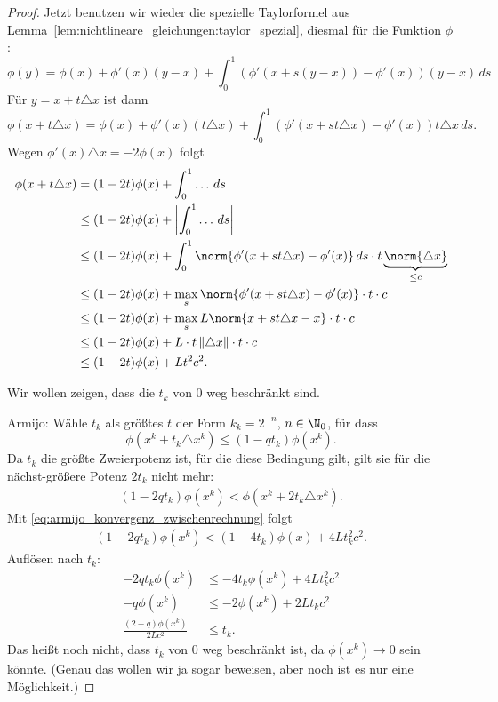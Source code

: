\begin{proof}
Jetzt benutzen wir wieder die spezielle Taylorformel aus Lemma~\ref{lem:nichtlineare_gleichungen:taylor_spezial},
diesmal für die Funktion $\phi$:
\begin{equation*}
 \phi(y)=\phi(x)+\phi'(x)(y-x)+\int_0^1 ( \phi'(x+s(y-x))-\phi'(x) )(y-x) \,ds
\end{equation*}
Für $y=x+t \triangle x$ ist dann
\begin{equation*}
 \phi(x+t \triangle x)
 =
 \phi(x)+\phi'(x)(t \triangle x)+\int_0^1 ( \phi'(x+st \triangle x)-\phi'(x) )t \triangle x \,ds.
\end{equation*}
Wegen $\phi'(x) \triangle x=-2 \phi(x)$ folgt
\begin{align}
\nonumber
 \phi (x+t \triangle x) & =(1-2t) \phi (x)+\int_0^1 \ldots \,ds \\
\nonumber
 & \leq (1-2t) \phi (x)+\left\vert \int_0^1 \ldots \,ds \right\vert \\
\nonumber
 & \leq (1-2t) \phi (x)+\int_0^1 \norm{ \phi'(x+st \triangle x)-\phi'(x) } \,ds \cdot t \underbrace{\norm{\triangle x}}_{\leq c} \\
\nonumber
 & \leq (1-2t) \phi (x)+\max_s \norm{ \phi'(x+st \triangle x)-\phi'(x) } \cdot t \cdot c \\
\nonumber
 & \leq (1-2t) \phi (x)+\max_s L \norm{ x+st \triangle x-x } \cdot t \cdot c \\
\nonumber
 & \leq (1-2t) \phi (x)+L \cdot t \left\Vert \triangle x \right\Vert \cdot t \cdot c \\
\label{eq:armijo_konvergenz_zwischenrechnung}
 & \leq (1-2t) \phi (x)+Lt^2c^2.
\end{align}

Wir wollen zeigen, dass die $t_k$ von $0$ weg beschränkt sind.

\medskip

Armijo: Wähle $t_k$ als größtes $t$ der Form $k_k = 2^{-n}$, $n \in \N_0$, für dass
\begin{equation*}
 \phi (x^k+t_k \triangle x^k ) \leq (1-qt_k ) \phi (x^k).
\end{equation*}
Da $t_k$ die größte Zweierpotenz ist, für die diese Bedingung gilt, gilt sie für die nächst-größere Potenz $2t_k$
nicht mehr:
\begin{align*}
 (1-2qt_k ) \phi (x^k) < \phi (x^k+2t_k \triangle x^k ).
\end{align*}
Mit \eqref{eq:armijo_konvergenz_zwischenrechnung} folgt
\begin{align*}
 (1-2qt_k ) \phi (x^k) < (1-4t_k) \phi(x) + 4Lt_k^2c^2.
\end{align*}
Auflösen nach $t_k$:
\begin{align*}
 -2qt_k \phi (x^k) & \le -4t_k \phi (x^k ) + 4Lt_k^2c^2 \\
 -q \phi (x^k) & \le -2 \phi (x^k ) + 2Lt_kc^2 \\
 \frac{(2-q) \phi (x^k )}{2Lc^2} & \le t_k.
\end{align*}
Das heißt noch nicht, dass $t_k$ von $0$ weg beschränkt ist, da $\phi (x^k ) \to 0$ sein könnte.
(Genau das wollen wir ja sogar beweisen, aber noch ist es nur eine Möglichkeit.)


\end{proof}
